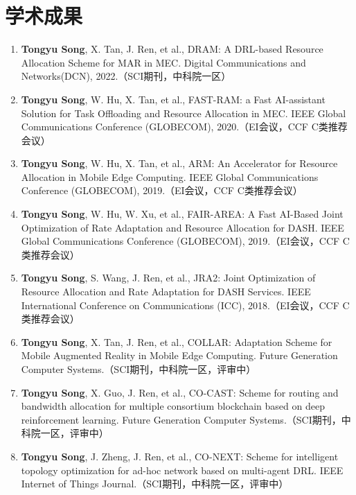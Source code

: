\documentclass{resume}
\begin{document}
\section{\faUniversity  学术成果}
\begin{enumerate}
  \item \textbf{Tongyu Song}, X. Tan, J. Ren, et al., DRAM: A DRL-based Resource Allocation Scheme for MAR in MEC.
  Digital Communications and Networks(DCN), 2022.（SCI期刊，中科院一区）
  \item \textbf{Tongyu Song}, W. Hu, X. Tan, et al., FAST-RAM: a Fast AI-assistant Solution for Task Offloading and Resource Allocation in MEC. IEEE Global Communications Conference (GLOBECOM), 2020.（EI会议，CCF C类推荐会议）
  \item \textbf{Tongyu Song}, W. Hu, X. Tan, et al., ARM: An Accelerator for Resource Allocation in Mobile Edge Computing. IEEE Global Communications Conference (GLOBECOM), 2019.（EI会议，CCF C类推荐会议）
  \item \textbf{Tongyu Song}, W. Hu, W. Xu, et al., FAIR-AREA: A Fast AI-Based Joint Optimization of Rate Adaptation and Resource Allocation for DASH. IEEE Global Communications Conference (GLOBECOM), 2019.（EI会议，CCF C类推荐会议）
  \item \textbf{Tongyu Song}, S. Wang, J. Ren, et al., JRA2: Joint Optimization of Resource Allocation and Rate Adaptation for DASH Services. IEEE International Conference on Communications (ICC), 2018.（EI会议，CCF C类推荐会议）
  \item \textbf{Tongyu Song}, X. Tan, J. Ren, et al., COLLAR: Adaptation Scheme for Mobile Augmented Reality in Mobile Edge Computing. Future Generation Computer Systems.（SCI期刊，中科院一区，评审中）
  \item\textbf{Tongyu Song}, X. Guo, J. Ren, et al., CO-CAST: Scheme for routing and bandwidth allocation for multiple consortium blockchain based on deep reinforcement learning. Future Generation Computer Systems.（SCI期刊，中科院一区，评审中）
  \item\textbf{Tongyu Song}, J. Zheng, J. Ren, et al., CO-NEXT: Scheme for intelligent topology optimization for ad-hoc network based on multi-agent DRL. IEEE Internet of Things Journal.（SCI期刊，中科院一区，评审中）
\end{enumerate}
\end{document}
